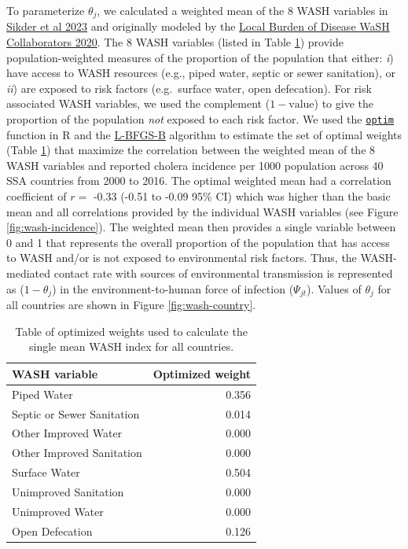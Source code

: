 \documentclass[
]{book}
\begin{document}
To parameterize \(\theta_j\), we calculated a weighted mean of the 8 WASH variables in \href{https://doi.org/10.1021/acs.est.3c01317}{Sikder et al 2023} and originally modeled by the \href{https://www.thelancet.com/journals/langlo/article/PIIS2214-109X(20)30278-3/fulltext}{Local Burden of Disease WaSH Collaborators 2020}. The 8 WASH variables (listed in Table \ref{tab:wash-weights}) provide population-weighted measures of the proportion of the population that either: \emph{i}) have access to WASH resources (e.g., piped water, septic or sewer sanitation), or \emph{ii}) are exposed to risk factors (e.g.~surface water, open defecation). For risk associated WASH variables, we used the complement (\(1-\text{value}\)) to give the proportion of the population \emph{not} exposed to each risk factor. We used the \href{https://www.rdocumentation.org/packages/stats/versions/3.6.2/topics/optim}{\texttt{optim}} function in R and the \href{https://en.wikipedia.org/wiki/Limited-memory_BFGS}{L-BFGS-B} algorithm to estimate the set of optimal weights (Table \ref{tab:wash-weights}) that maximize the correlation between the weighted mean of the 8 WASH variables and reported cholera incidence per 1000 population across 40 SSA countries from 2000 to 2016. The optimal weighted mean had a correlation coefficient of \(r =\) -0.33 (-0.51 to -0.09 95\% CI) which was higher than the basic mean and all correlations provided by the individual WASH variables (see Figure \ref{fig:wash-incidence}). The weighted mean then provides a single variable between 0 and 1 that represents the overall proportion of the population that has access to WASH and/or is not exposed to environmental risk factors. Thus, the WASH-mediated contact rate with sources of environmental transmission is represented as (\(1-\theta_j\)) in the environment-to-human force of infection (\(\Psi_{jt}\)). Values of \(\theta_j\) for all countries are shown in Figure \ref{fig:wash-country}.

\begin{table}
\centering
\caption{\label{tab:wash-weights}Table of optimized weights used to calculate the single mean WASH index for all countries.}
\centering
\begin{tabular}[t]{l|r}
\hline
WASH variable & Optimized weight\\
\hline
Piped Water & 0.356\\
\hline
Septic or Sewer Sanitation & 0.014\\
\hline
Other Improved Water & 0.000\\
\hline
Other Improved Sanitation & 0.000\\
\hline
Surface Water & 0.504\\
\hline
Unimproved Sanitation & 0.000\\
\hline
Unimproved Water & 0.000\\
\hline
Open Defecation & 0.126\\
\hline
\end{tabular}
\end{table}
\end{document}
